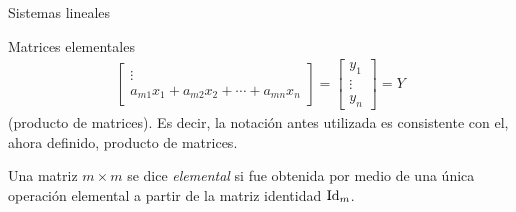 \begin{chapter}{Sistemas lineales}
\begin{section}{Matrices elementales}
\begin{align*}
\begin{bmatrix}
            \vdots \\
            a_{m1}x_1 +a_{m2}x_2+\cdots +a_{mn}x_n\end{bmatrix} =
            \begin{bmatrix}
            y_1 \\ \vdots \\ y_n
            \end{bmatrix} = Y
            \end{align*}
            (producto de matrices). Es decir, la notación antes utilizada es consistente con el, ahora definido, producto de matrices.  
            
            \begin{definicion} Una matriz $m \times m$  se dice  \textit{elemental} si fue obtenida por medio de una única operación elemental a partir de la matriz identidad $\operatorname{Id}_m$.
            \end{definicion}
            

\end{section}
\end{chapter}
